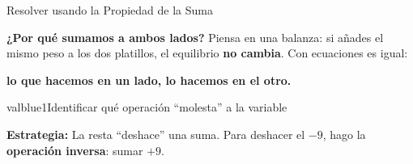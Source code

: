 \documentclass[12pt, letterpaper]{article}
\begin{document}
	\begin{ejemploresuelto}{Resolver usando la Propiedad de la Suma}
		
		\textbf{¿Por qué sumamos a ambos lados?} Piensa en una balanza: si añades el
		mismo peso a los dos platillos, el equilibrio \textbf{no cambia}. Con ecuaciones es igual: 
		\begin{center}
			\textbf{lo que hacemos en un lado, lo hacemos en el otro.}
		\end{center}
		\vspace{0.4cm}
		\begin{pasocaja}{valblue}{1}{Identificar qué operación ``molesta'' a la variable}
			\begin{center}
			\end{center}
			\textbf{Estrategia:} La resta ``deshace'' una suma.
			Para deshacer el $-9$, hago la \textbf{operación inversa}: sumar $+9$.
		\end{pasocaja}
		

\end{ejemploresuelto}
\end{document}

